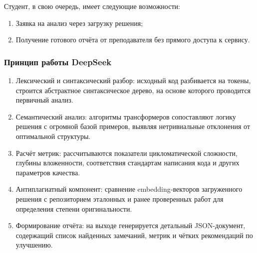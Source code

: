 Студент, в свою очередь, имеет следующие возможности:

\begin{enumerate}
    \item Заявка на анализ через загрузку решения;
    \item Получение готового отчёта от преподавателя без прямого доступа к сервису.
\end{enumerate}

\subsubsection{Принцип работы DeepSeek}

\begin{enumerate}
  \item Лексический и синтаксический разбор: исходный код разбивается на токены, строится абстрактное синтаксическое дерево, на основе которого проводится первичный анализ.
  \item Семантический анализ: алгоритмы трансформеров сопоставляют логику решения с огромной базой примеров, выявляя нетривиальные отклонения от оптимальной структуры.
  \item Расчёт метрик: рассчитываются показатели цикломатической сложности, глубины вложенности, соответствия стандартам написания кода и других параметров качества.
  \item Антиплагиатный компонент: сравнение embedding‐векторов загруженного решения с репозиторием эталонных и ранее проверенных работ для определения степени оригинальности.
  \item Формирование отчёта: на выходе генерируется детальный JSON-документ, содержащий список найденных замечаний, метрик и чётких рекомендаций по улучшению.
\end{enumerate}
